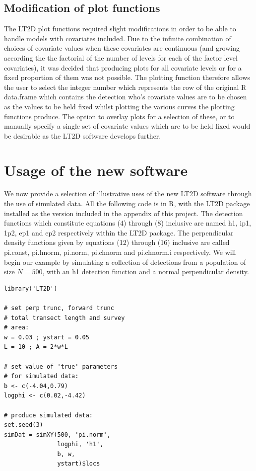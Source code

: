 \documentclass[11pt]{article}
\begin{document}
\begin{multicols}{2}
\subsection{Modification of plot functions}
The LT2D plot functions required slight modifications in order to be able to handle models with covariates included. Due to the infinite combination of choices of covariate values when these covariates are continuous (and growing according the the factorial of the number of levels for each of the factor level covariates), it was decided that producing plots for all covariate levels or for a fixed proportion of them was not possible. The plotting function therefore allows the user to select the integer number which represents the row of the original R data.frame which contains the detection who's covariate values are to be chosen as the values to be held fixed whilst plotting the various curves the plotting functions produce.  The option to overlay plots for a selection of these, or to manually specify a single set of covariate values which are to be held fixed would be desirable as the LT2D software develops further.

\section{Usage of the new software}
We now provide a selection of illustrative uses of the new LT2D software through the use of simulated data. All the following code is in R, with the LT2D package installed as the version included in the appendix of this project. The detection functions which constitute equations (4) through (8) inclusive are named h1, ip1, 1p2, ep1 and ep2 respectively within the LT2D package. The perpendicular density functions given by equations (12) through (16) inclusive are called pi.const, pi.hnorm, pi.norm, pi.chnorm and pi.chnorm.i respectively. We will begin our example by simulating a collection of detections from a population of size $N=500$, with an h1 detection function and a normal perpendicular density. 

\begingroup
\small
\begin{lstlisting}
library('LT2D')

# set perp trunc, forward trunc
# total transect length and survey
# area:
w = 0.03 ; ystart = 0.05
L = 10 ; A = 2*w*L

# set value of 'true' parameters
# for simulated data:
b <- c(-4.04,0.79)
logphi <- c(0.02,-4.42)

# produce simulated data:
set.seed(3)
simDat = simXY(500, 'pi.norm',
               logphi, 'h1', 
               b, w, 
               ystart)$locs
\end{lstlisting}
\endgroup


\end{multicols}
\end{document}
